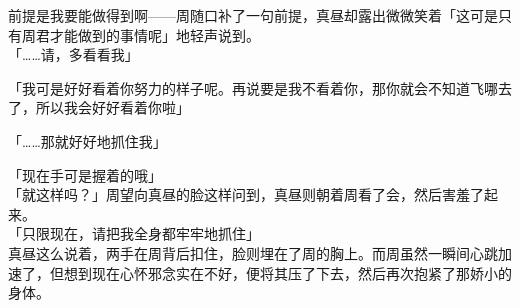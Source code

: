 前提是我要能做得到啊——周随口补了一句前提，真昼却露出微微笑着「这可是只有周君才能做到的事情呢」地轻声说到。\\

「……请，多看看我」

「我可是好好看着你努力的样子呢。再说要是我不看着你，那你就会不知道飞哪去了，所以我会好好看着你啦」

「……那就好好地抓住我」

「现在手可是握着的哦」\\

「就这样吗？」周望向真昼的脸这样问到，真昼则朝着周看了会，然后害羞了起来。\\

「只限现在，请把我全身都牢牢地抓住」\\

真昼这么说着，两手在周背后扣住，脸则埋在了周的胸上。而周虽然一瞬间心跳加速了，但想到现在心怀邪念实在不好，便将其压了下去，然后再次抱紧了那娇小的身体。
